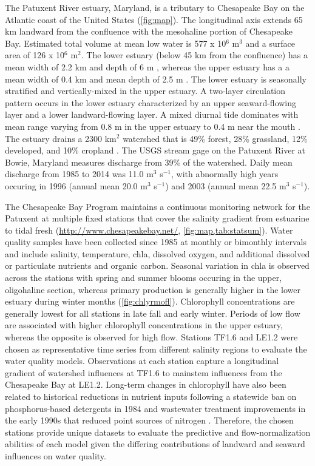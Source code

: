\documentclass[letterpaper,12pt,oneside]{article}\usepackage[]{graphicx}\usepackage[]{color}
\begin{document}
The Patuxent River estuary, Maryland, is a tributary to Chesapeake Bay on the Atlantic coast of the United States (\cref{fig:map}). The longitudinal axis extends 65 km landward from the confluence with the mesohaline portion of Chesapeake Bay.  Estimated total volume at mean low water is 577 x 10$^6$ m$^3$ and a surface area of 126 x 10$^6$ m$^2$.  The lower estuary (below 45 km from the confluence) has a mean width of 2.2 km and depth of 6 m \citep{Cronin75}, whereas the upper estuary has a a mean width of 0.4 km and mean depth of 2.5 m \citep{Hagythes}.  The lower estuary is seasonally stratified and vertically-mixed in the upper estuary.  A two-layer circulation pattern occurs in the lower estuary characterized by an upper seaward-flowing layer and a lower landward-flowing layer.  A mixed diurnal tide dominates with mean range varying from 0.8 m in the upper estuary to 0.4 m near the mouth \citep{Boicourt98}.  The estuary drains a 2300 km$^2$ watershed that is 49\% forest, 28\% grassland, 12\% developed, and 10\% cropland \citep{Jordan03}.  The \ac{USGS} stream gage on the Patuxent River at Bowie, Maryland measures discharge from 39\% of the watershed.  Daily mean discharge from 1985 to 2014 was 11.0 m$^3$ s$^{-1}$, with abnormally high years occuring in 1996 (annual mean 20.0 m$^3$ s$^{-1}$) and 2003 (annual mean 22.5  m$^3$ s$^{-1}$). 

The Chesapeake Bay Program maintains a continuous monitoring network for the Patuxent at multiple fixed stations that cover the salinity gradient from estuarine to tidal fresh (\href{http://www.chesapeakebay.net/}{http://www.chesapeakebay.net/}, \cref{fig:map,tab:statsum}).  Water quality samples have been collected since 1985 at monthly or bimonthly intervals and include salinity, temperature, \ac{chla}, dissolved oxygen, and additional dissolved or particulate nutrients and organic carbon.  Seasonal variation in \ac{chla} is observed across the stations with spring and summer blooms occuring in the upper, oligohaline section, whereas primary production is generally higher in the lower estuary during winter months (\cref{fig:chlyrmofl}).  Chlorophyll concentrations are generally lowest for all stations in late fall and early winter.  Periods of low flow are associated with higher chlorophyll concentrations in the upper estuary, whereas the opposite is observed for high flow.  Stations TF1.6 and LE1.2 were chosen as representative time series from different salinity regions to evaluate the water quality models.  Observations at each station capture a longitudinal gradient of watershed influences at TF1.6 to mainstem influences from the Chesapeake Bay at LE1.2.  Long-term changes in chlorophyll have also been related to historical reductions in nutrient inputs following a statewide ban on phosphorus-based detergents in 1984 and wastewater treatment improvements in the early 1990s that reduced point sources of nitrogen \citep{Lung03,Testa08a}.  Therefore, the chosen stations provide unique datasets to evaluate the predictive and flow-normalization abilities of each model given the differing contributions of landward and seaward influences on water quality.
\end{document}
